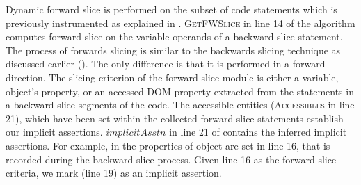 Dynamic forward slice is performed on the subset of code statements which is previously instrumented as explained in . 
\textsc{GetFWSlice} in line 14 of the algorithm computes forward slice on the variable operands of a backward slice statement.
The process of forwards slicing is similar to the backwards slicing technique as discussed earlier (). The only difference is that it is performed in a forward direction. The slicing criterion of the forward slice module is either a variable, object's property, or an accessed DOM property extracted from the statements in a backward slice segments of the code. The accessible entities (\textsc{Accessibles} in line 21), which have been set within the collected forward slice statements establish our implicit assertions.
$implicitAsstn$ in line 21 of  contains the inferred implicit assertions.
For example, in  the properties of object  are set in line 16, that is recorded during the backward slice process. Given line 16 as the forward slice criteria, we mark  (line 19) as an implicit assertion.        